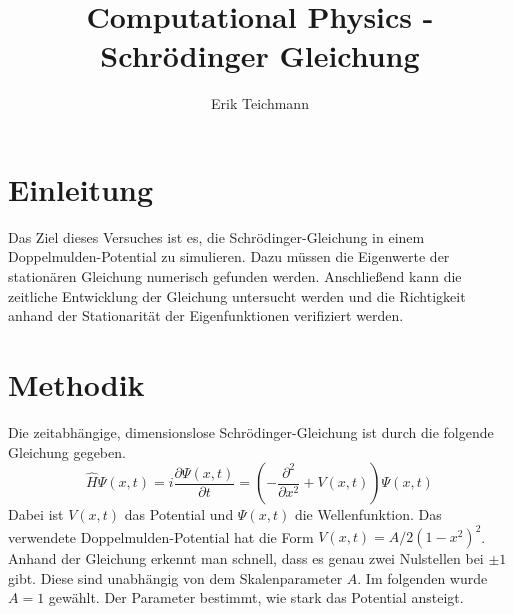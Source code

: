 \documentclass[a4paper, 11pt]{scrartcl}
\author{Erik Teichmann}
\title{Computational Physics - Schrödinger Gleichung}
\begin{document}

\let\endtitlepage\relax
{}

\section{Einleitung}
Das Ziel dieses Versuches ist es, die Schrödinger-Gleichung in einem Doppelmulden-Potential zu simulieren. Dazu müssen die Eigenwerte der stationären Gleichung numerisch gefunden werden. Anschließend kann die zeitliche Entwicklung der Gleichung untersucht werden und die Richtigkeit anhand der Stationarität der Eigenfunktionen verifiziert werden.

\section{Methodik}
Die zeitabhängige, dimensionslose Schrödinger-Gleichung ist durch die folgende Gleichung gegeben.
%
\begin{equation}
\hat{H} \Psi(x, t) = i \frac{\partial \Psi(x, t)}{\partial t} = \left( - \frac{\partial^2}{\partial x^2}  + V(x, t) \right) \Psi(x, t) \label{eq:time_schroed}
\end{equation}
%
Dabei ist $V(x, t)$ das Potential und $\Psi(x, t)$ die Wellenfunktion. Das verwendete Doppelmulden-Potential hat die Form ${V(x, t) = A/2(1-x^2)^2}$. Anhand der Gleichung erkennt man schnell, dass es genau zwei Nulstellen bei $\pm 1$ gibt. Diese sind unabhängig von dem Skalenparameter $A$. Im folgenden wurde $A = 1$ gewählt. Der Parameter bestimmt, wie stark das Potential ansteigt.
%
\end{document}
